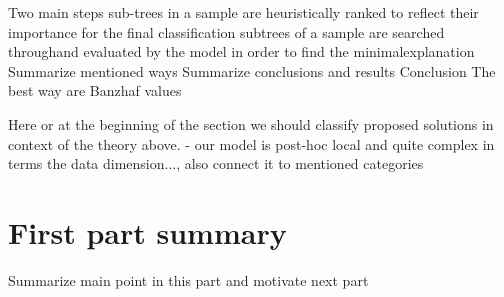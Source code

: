 
Two main steps
    sub-trees in a sample are heuristically ranked to reflect their importance for the final classification
    subtrees of a sample are searched throughand evaluated by the model in order to find the minimalexplanation
Summarize mentioned ways
Summarize conclusions and results
    Conclusion The best way are Banzhaf values

Here or at the beginning of the section we should classify proposed solutions in context of the theory above. - our model is post-hoc local and quite complex in terms the data dimension..., also connect it to mentioned categories


\section{First part summary}
Summarize main point in this part and motivate next part




